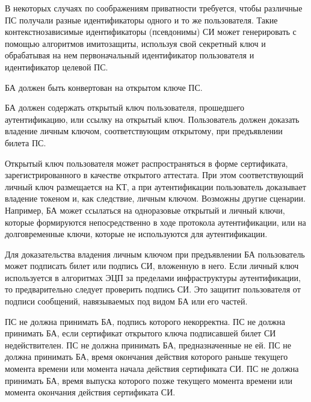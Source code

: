 \begin{note}
В некоторых случаях по соображениям приватности требуется, 
чтобы различные ПС получали разные идентификаторы одного и то же 
пользователя.
%
Такие контекстнозависимые идентификаторы (псевдонимы) СИ может генерировать
с помощью алгоритмов имитозащиты, используя свой секретный ключ и обрабатывая 
на нем первоначальный идентификатор пользователя и идентификатор целевой ПС.
\end{note}

БА должен быть конвертован на открытом ключе ПС.

БА должен содержать открытый ключ пользователя, прошедшего аутентификацию, или 
ссылку на открытый ключ.
%
Пользователь должен доказать владение личным ключом, соответствующим  
открытому, при предъявлении билета ПС.

\begin{note}
Открытый ключ пользователя может распространяться в форме сертификата, 
зарегистрированного в качестве открытого аттестата. 
%
При этом соответствующий личный ключ размещается на КТ, а при 
аутентификации пользователь доказывает владение токеном и, как следствие, 
личным ключом.
%
Возможны другие сценарии. Например, БА может ссылаться на одноразовые открытый 
и личный ключи, которые формируются непосредственно в ходе протокола
аутентификации, или на долговременные ключи, которые не используются для
аутентификации.
\end{note}

\begin{note}
Для доказательства владения личным ключом при предъявлении БА пользователь
может подписать билет или подпись СИ, вложенную в него. 
%
Если личный ключ используется в алгоритмах ЭЦП за пределами инфраструктуры 
аутентификации, то предварительно следует проверить подпись СИ.
%
Это защитит пользователя от подписи сообщений, навязываемых под видом БА или 
его частей.
\end{note}

ПС не должна принимать БА, подпись которого некорректна.
%
ПС не должна принимать БА, если сертификат открытого ключа подписавшей билет СИ 
недействителен.
%
ПС не должна принимать БА, предназначенные не ей.
%
ПС не должна принимать БА, время окончания действия которого раньше текущего 
момента времени или момента начала действия сертификата СИ.
%
ПС не должна принимать БА, время выпуска которого позже текущего момента 
времени или момента окончания действия сертификата СИ. 

